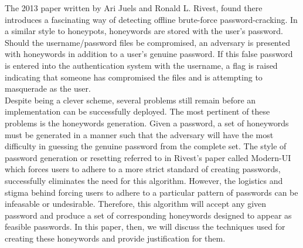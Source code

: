 The 2013 paper written by Ari Juels and Ronald L. Rivest, found  there%
introduces a fascinating way of detecting offline brute-force password-cracking. In a similar style to honeypots, honeywords are stored with the user's password. Should the username/password files be compromised, an adversary is presented with honeywords in addition to a user's genuine password. If this false password is entered into the authentication system with the username, a flag is raised indicating that someone has compromised the files and is attempting to masquerade as the user. \\

Despite being a clever scheme, several problems still remain before an implementation can be successfully deployed. The most pertinent of these problems is the honeywords generation. Given a password, a set of honeywords must be generated in a manner such that the adversary will have the most difficulty in guessing the genuine password from the complete set. The style of password generation or resetting referred to in Rivest's paper called Modern-UI which forces users to adhere to a more strict standard of creating passwords, successfully eliminates the need for this algorithm. However, the logistics and stigma behind forcing users to adhere to a particular pattern of passwords can be infeasable or undesirable. Therefore, this algorithm will accept any given password and produce a set of corresponding honeywords designed to appear as feasible passwords. In this paper, then, we will discuss the techniques used for creating these honeywords and provide justification for them.\\




